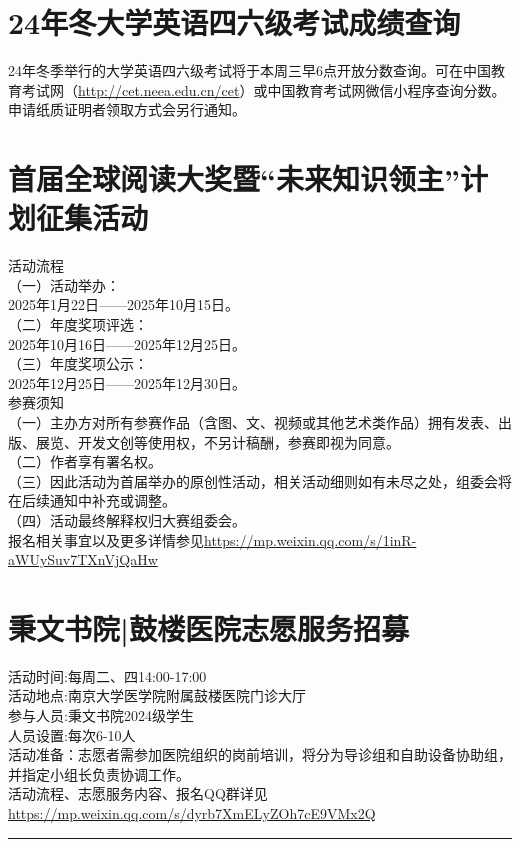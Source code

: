\documentclass[letterpaper, 12pt]{article}
\begin{document}
\begin{multicols}{2}
\section{24年冬大学英语四六级考试成绩查询}
24年冬季举行的大学英语四六级考试将于本周三早6点开放分数查询。可在中国教育考试网（\url{http://cet.neea.edu.cn/cet}）或中国教育考试网微信小程序查询分数。申请纸质证明者领取方式会另行通知。

\section{首届全球阅读大奖暨“未来知识领主”计划征集活动}
活动流程\\
（一）活动举办：\\
2025年1月22日——2025年10月15日。\\
（二）年度奖项评选：\\
2025年10月16日——2025年12月25日。\\
（三）年度奖项公示：\\
2025年12月25日——2025年12月30日。\\
参赛须知\\
（一）主办方对所有参赛作品（含图、文、视频或其他艺术类作品）拥有发表、出版、展览、开发文创等使用权，不另计稿酬，参赛即视为同意。\\
（二）作者享有署名权。\\
（三）因此活动为首届举办的原创性活动，相关活动细则如有未尽之处，组委会将在后续通知中补充或调整。\\
（四）活动最终解释权归大赛组委会。\\
报名相关事宜以及更多详情参见\url{https://mp.weixin.qq.com/s/1inR-aWUySuv7TXnVjQaHw}\\

\section{秉文书院|鼓楼医院志愿服务招募}
活动时间:每周二、四14:00-17:00\\
活动地点:南京大学医学院附属鼓楼医院门诊大厅\\
参与人员:秉文书院2024级学生\\
人员设置:每次6-10人\\
活动准备：志愿者需参加医院组织的岗前培训，将分为导诊组和自助设备协助组，并指定小组长负责协调工作。\\
活动流程、志愿服务内容、报名QQ群详见\url{https://mp.weixin.qq.com/s/dyrb7XmELyZOh7cE9VMx2Q}

\end{multicols} 
\hrule
\end{document}
